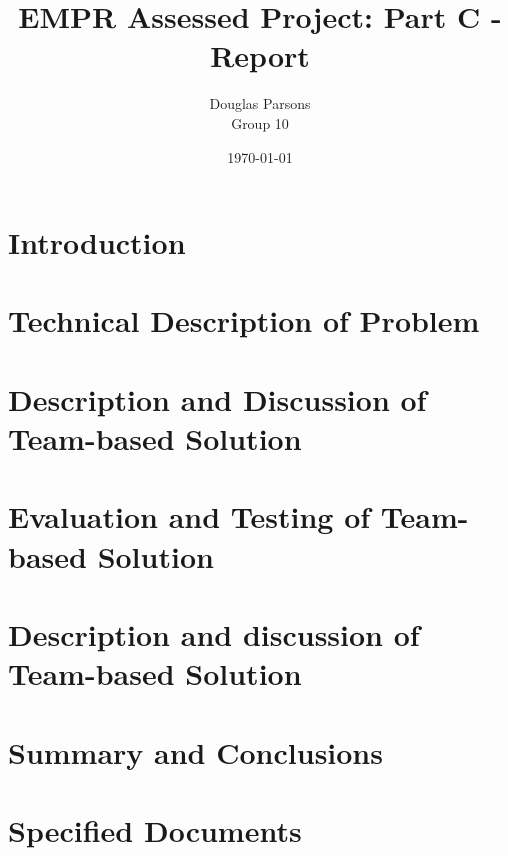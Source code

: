\documentclass[a4paper]{report}
\begin{document}
\title{EMPR Assessed Project: Part C - Report}
\author{Douglas Parsons\\
         Group 10}
\date{\today}
\maketitle

\tableofcontents

\chapter{Introduction}

\chapter{Technical Description of Problem}

\chapter{Description and Discussion of Team-based Solution}

\chapter{Evaluation and Testing of Team-based Solution}

\chapter{Description and discussion of Team-based Solution}

\chapter{Summary and Conclusions}

\chapter{Specified Documents}
\end{document}
